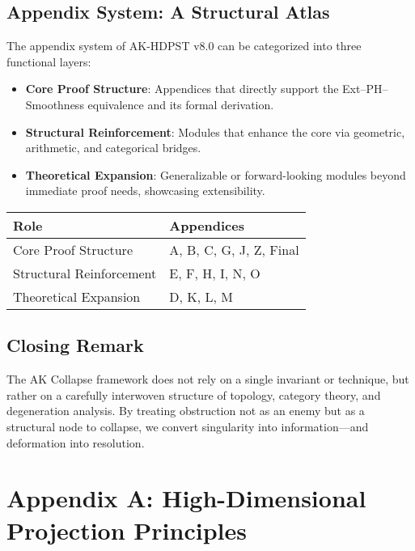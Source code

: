 \documentclass[11pt]{article}
\begin{document}
\subsection*{Appendix System: A Structural Atlas}

The appendix system of AK-HDPST v8.0 can be categorized into three functional layers:

\begin{itemize}
  \item \textbf{Core Proof Structure}: Appendices that directly support the Ext–PH–Smoothness equivalence and its formal derivation.
  \item \textbf{Structural Reinforcement}: Modules that enhance the core via geometric, arithmetic, and categorical bridges.
  \item \textbf{Theoretical Expansion}: Generalizable or forward-looking modules beyond immediate proof needs, showcasing extensibility.
\end{itemize}

\vspace{1em}

\begin{center}
\renewcommand{\arraystretch}{1.2}
\begin{tabular}{ll}
\toprule
\textbf{Role} & \textbf{Appendices} \\
\midrule
Core Proof Structure & A, B, C, G, J, Z, Final \\
Structural Reinforcement & E, F, H, I, N, O \\
Theoretical Expansion & D, K, L, M \\
\bottomrule
\end{tabular}
\end{center}

\subsection*{Closing Remark}

The AK Collapse framework does not rely on a single invariant or technique, but rather on a carefully interwoven structure of topology, category theory, and degeneration analysis. By treating obstruction not as an enemy but as a structural node to collapse, we convert singularity into information—and deformation into resolution.





\section*{Appendix A: High-Dimensional Projection Principles}
\end{document}
